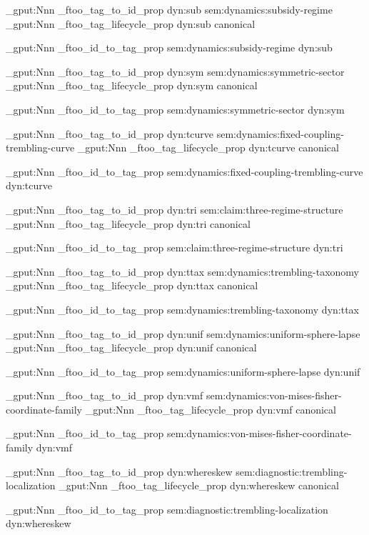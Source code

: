 \prop_gput:Nnn \g_ftoo_tag_to_id_prop { dyn:sub } { sem:dynamics:subsidy-regime }
\prop_gput:Nnn \g_ftoo_tag_lifecycle_prop { dyn:sub } { canonical }

\prop_gput:Nnn \g_ftoo_id_to_tag_prop { sem:dynamics:subsidy-regime } { dyn:sub }


\prop_gput:Nnn \g_ftoo_tag_to_id_prop { dyn:sym } { sem:dynamics:symmetric-sector }
\prop_gput:Nnn \g_ftoo_tag_lifecycle_prop { dyn:sym } { canonical }

\prop_gput:Nnn \g_ftoo_id_to_tag_prop { sem:dynamics:symmetric-sector } { dyn:sym }


\prop_gput:Nnn \g_ftoo_tag_to_id_prop { dyn:tcurve } { sem:dynamics:fixed-coupling-trembling-curve }
\prop_gput:Nnn \g_ftoo_tag_lifecycle_prop { dyn:tcurve } { canonical }

\prop_gput:Nnn \g_ftoo_id_to_tag_prop { sem:dynamics:fixed-coupling-trembling-curve } { dyn:tcurve }


\prop_gput:Nnn \g_ftoo_tag_to_id_prop { dyn:tri } { sem:claim:three-regime-structure }
\prop_gput:Nnn \g_ftoo_tag_lifecycle_prop { dyn:tri } { canonical }

\prop_gput:Nnn \g_ftoo_id_to_tag_prop { sem:claim:three-regime-structure } { dyn:tri }


\prop_gput:Nnn \g_ftoo_tag_to_id_prop { dyn:ttax } { sem:dynamics:trembling-taxonomy }
\prop_gput:Nnn \g_ftoo_tag_lifecycle_prop { dyn:ttax } { canonical }

\prop_gput:Nnn \g_ftoo_id_to_tag_prop { sem:dynamics:trembling-taxonomy } { dyn:ttax }


\prop_gput:Nnn \g_ftoo_tag_to_id_prop { dyn:unif } { sem:dynamics:uniform-sphere-lapse }
\prop_gput:Nnn \g_ftoo_tag_lifecycle_prop { dyn:unif } { canonical }

\prop_gput:Nnn \g_ftoo_id_to_tag_prop { sem:dynamics:uniform-sphere-lapse } { dyn:unif }


\prop_gput:Nnn \g_ftoo_tag_to_id_prop { dyn:vmf } { sem:dynamics:von-mises-fisher-coordinate-family }
\prop_gput:Nnn \g_ftoo_tag_lifecycle_prop { dyn:vmf } { canonical }

\prop_gput:Nnn \g_ftoo_id_to_tag_prop { sem:dynamics:von-mises-fisher-coordinate-family } { dyn:vmf }


\prop_gput:Nnn \g_ftoo_tag_to_id_prop { dyn:whereskew } { sem:diagnostic:trembling-localization }
\prop_gput:Nnn \g_ftoo_tag_lifecycle_prop { dyn:whereskew } { canonical }

\prop_gput:Nnn \g_ftoo_id_to_tag_prop { sem:diagnostic:trembling-localization } { dyn:whereskew }


